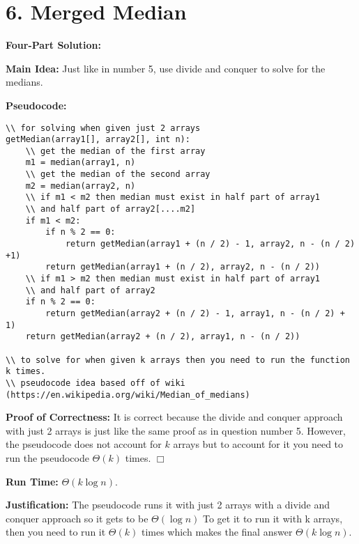 \documentclass[11pt]{article}
\def\endproofmark{$\Box$}
\newenvironment{FourPartSolution}{\par{\bf Four-Part Solution:}}{\smallskip}
\newenvironment{mainIdea}{\par{\bf Main Idea:}}{\smallskip}
\newenvironment{pseudocode}{\par{\bf Pseudocode:}}{\smallskip}
\newenvironment{proofOfCorrectness}{\par{\bf Proof of Correctness:}}{\endproofmark\smallskip}
\newenvironment{runTime}{\par{\bf Run Time:}}{\smallskip}
\newenvironment{justification}{\par{\bf Justification:}}{\smallskip}
\begin{document}
\section*{6. Merged Median}
\begin{FourPartSolution}
\begin{mainIdea}
Just like in number 5, use divide and conquer to solve for the medians.
\end{mainIdea}
\begin{pseudocode}
\begin{lstlisting}
\\ for solving when given just 2 arrays
getMedian(array1[], array2[], int n):
	\\ get the median of the first array
    m1 = median(array1, n)
    \\ get the median of the second array
    m2 = median(array2, n)
    \\ if m1 < m2 then median must exist in half part of array1
    \\ and half part of array2[....m2]
    if m1 < m2:
        if n % 2 == 0:
            return getMedian(array1 + (n / 2) - 1, array2, n - (n / 2) +1)
        return getMedian(array1 + (n / 2), array2, n - (n / 2))
    \\ if m1 > m2 then median must exist in half part of array1
    \\ and half part of array2
    if n % 2 == 0:
        return getMedian(array2 + (n / 2) - 1, array1, n - (n / 2) + 1)
    return getMedian(array2 + (n / 2), array1, n - (n / 2))

\\ to solve for when given k arrays then you need to run the function k times.
\\ pseudocode idea based off of wiki (https://en.wikipedia.org/wiki/Median_of_medians)
\end{lstlisting}
\end{pseudocode}
\begin{proofOfCorrectness}
It is correct because the divide and conquer approach with just 2 arrays is just like the same proof as in question number 5. However, the pseudocode does not account for $k$ arrays but to account for it you need to run the pseudocode $\Theta(k)$ times.
\end{proofOfCorrectness}
\begin{runTime}
$\Theta(k\log{n})$.
\end{runTime}
\begin{justification}
The pseudocode runs it with just 2 arrays with a divide and conquer approach so it gets to be $\Theta(\log{n})$ To get it to run it with k arrays, then you need to run it $\Theta(k)$ times which makes the final answer $\Theta(k\log{n})$.
\end{justification}
\end{FourPartSolution}
\end{document}
